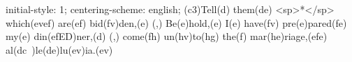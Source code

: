 initial-style: 1;
centering-scheme: english;
(c3)Tell(d) them(de) <sp>*</sp> which(evef) are(ef) bid(fv)den,(e) (,) Be(e)hold,(e) I(e) have(fv) pre(e)pared(fe) my(e) din(efED)ner,(d) (,) come(fh) un(hv)to(hg) the(f) mar(he)riage,(efe) al(dc~)le(de)lu(ev)ia.(ev)
